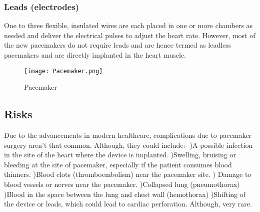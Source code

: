 \documentclass[12pt]{article}
\begin{document}
\begin{normalsize}
\subsubsection{Leads (electrodes)}
One to three flexible, insulated wires are each placed in one or more chambers as needed and deliver the electrical pulses to adjust the heart rate. However, most of the new pacemakers do not require leads and are hence termed as leadless pacemakers and are directly implanted in the heart muscle.
\begin{figure}[h]
\centering
\texttt{[image: Pacemaker.png]}
\caption{Pacemaker}
\end{figure}
\subsection{Risks}
Due to the advancements in modern healthcare, complications due to pacemaker surgery aren't that common. Although, they could include:-
)A possible infection in the site of the heart where the device is implanted.
)Swelling, bruising or bleeding at the site of pacemaker, especially if the patient consumes blood thinners.
)Blood clots (thromboembolism) near the pacemaker site.
) Damage to blood vessels or nerves near the pacemaker.
)Collapsed lung (pneumothorax)
)Blood in the space between the lung and chest wall (hemothorax)
)Shifting of the device or leads, which could lead to cardiac perforation. Although, very rare.

\end{normalsize}
\end{document}
